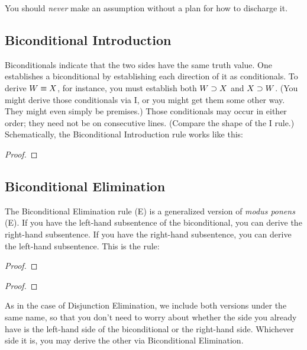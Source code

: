 You should \emph{never} make an assumption without a plan for how to discharge it.





\subsection{Biconditional Introduction}
Biconditionals indicate that the two sides have the same truth value. One establishes a biconditional by establishing each direction of it as conditionals. To derive $W \equiv X$, for instance, you must establish both $W \supset X$ and $X \supset W$. (You might derive those conditionals via {\eif}I, or you might get them some other way. They might even simply be premises.) Those conditionals may occur in either order; they need not be on consecutive lines. (Compare the shape of the {\eand}I rule.) Schematically, the Biconditional Introduction rule works like this:

\begin{proof}
	 
\end{proof}


\subsection{Biconditional Elimination}

The Biconditional Elimination rule ({\eiff}E) is a generalized version of \emph{modus ponens} ({\eif}E). If you have the left-hand subsentence of the biconditional, you can derive the right-hand subsentence. If you have the right-hand subsentence, you can derive the left-hand subsentence. This is the rule:



\begin{multicols}{2}
\begin{proof}
	\metaA{}
	\metaB{} 
\end{proof}
\begin{proof}
	\metaB{}
	\metaA{} 
\end{proof}
\end{multicols}

As in the case of Disjunction Elimination, we include both versions under the same name, so that you don't need to worry about whether the side you already have is the left-hand side of the biconditional or the right-hand side. Whichever side it is, you may derive the other via Biconditional Elimination.

\fi 

